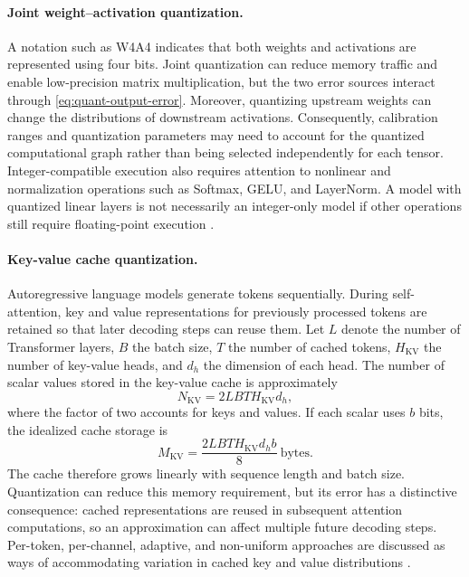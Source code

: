 \paragraph{Joint weight--activation quantization.}
A notation such as W4A4 indicates that both weights and activations
are represented using four bits. Joint quantization can reduce memory
traffic and enable low-precision matrix multiplication, but the two
error sources interact through
\cref{eq:quant-output-error}. Moreover, quantizing upstream weights
can change the distributions of downstream activations. Consequently,
calibration ranges and quantization parameters may need to account for
the quantized computational graph rather than being selected
independently for each tensor. Integer-compatible execution also
requires attention to nonlinear and normalization operations such as
Softmax, GELU, and LayerNorm. A model with quantized linear layers is
not necessarily an integer-only model if other operations still require
floating-point execution \parencite{chen2026llmquantization}.

\paragraph{Key-value cache quantization.}
Autoregressive language models generate tokens sequentially. During
self-attention, key and value representations for previously processed
tokens are retained so that later decoding steps can reuse them.
Let \(L\) denote the number of Transformer layers, \(B\) the batch
size, \(T\) the number of cached tokens, \(H_{\mathrm{KV}}\) the
number of key-value heads, and \(d_h\) the dimension of each head.
The number of scalar values stored in the key-value cache is
approximately
\begin{equation}
    N_{\mathrm{KV}}
    =
    2LBT H_{\mathrm{KV}}d_h,
    \label{eq:quant-kv-elements}
\end{equation}
where the factor of two accounts for keys and values. If each scalar
uses \(b\) bits, the idealized cache storage is
\begin{equation}
    M_{\mathrm{KV}}
    =
    \frac{2LBT H_{\mathrm{KV}}d_h b}{8}
    \ \text{bytes}.
    \label{eq:quant-kv-memory}
\end{equation}
The cache therefore grows linearly with sequence length and batch size.
Quantization can reduce this memory requirement, but its error has a
distinctive consequence: cached representations are reused in
subsequent attention computations, so an approximation can affect
multiple future decoding steps. Per-token, per-channel, adaptive, and
non-uniform approaches are discussed as ways of accommodating
variation in cached key and value distributions
\parencite{song2026targetcentricqat,chen2026llmquantization}.

